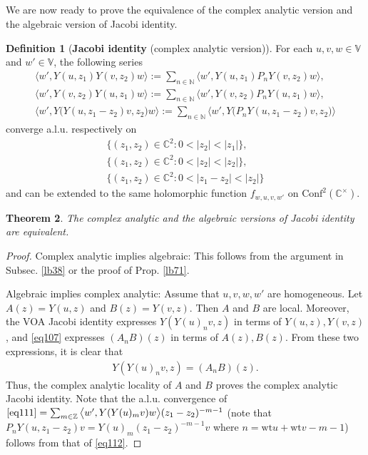 \documentclass[12pt,a4paper,notitlepage]{article}
\theoremstyle{definition}
\newtheorem{df}{Definition}[section]
\theoremstyle{plain}
\newtheorem{thm}[df]{Theorem}
\newcommand{\Conf}{\mathrm{Conf}}
\newcommand{\bigbk}[1]{\big\langle {#1}\big\rangle}
\newcommand{\Vbb}{\mathbb V}
\newcommand{\Cbb}{\mathbb C}
\newcommand{\Nbb}{\mathbb N}
\newcommand{\Zbb}{\mathbb Z}
\newcommand{\wt}{\mathrm{wt}}
\numberwithin{equation}{section}
\begin{document}
\subsection{}

We are now ready to prove the equivalence of the complex analytic version and the algebraic version of Jacobi identity.

\begin{df}[\textbf{Jacobi identity} (complex analytic version)]
For each $u,v,w\in\Vbb$ and $w'\in\Vbb$, the following series
\begin{subequations}
\begin{gather}
\bigbk{w',Y(u,z_1)Y(v,z_2)w}:=\sum_{n\in\Nbb}\bigbk{w',Y(u,z_1)P_nY(v,z_2)w},\label{eq109}\\
\bigbk{w',Y(v,z_2)Y(u,z_1)w}:=\sum_{n\in\Nbb}\bigbk{w',Y(v,z_2)P_nY(u,z_1)w},\label{eq110}\\
\bigbk{w',Y\big(Y(u,z_1-z_2)v,z_2\big)w}:=\sum_{n\in\Nbb}\bigbk{w',Y\big(P_nY(u,z_1-z_2)v,z_2\big)}\label{eq111}
\end{gather}	
\end{subequations}
converge a.l.u. respectively on
\begin{subequations}
\begin{gather}
\{(z_1,z_2)\in\Cbb^2:0<|z_2|<|z_1|\},\\
\{(z_1,z_2)\in\Cbb^2:0<|z_2|<|z_2|\},\\
\{(z_1,z_2)\in\Cbb^2:0<|z_1-z_2|<|z_2|\}
\end{gather}	
\end{subequations}
and can be extended to the same holomorphic function $f_{w,u,v,w'}$ on $\Conf^2(\Cbb^\times)$.
\end{df}

\begin{thm}
The complex analytic and the algebraic versions of Jacobi identity are equivalent.
\end{thm}

\begin{proof}
Complex analytic implies algebraic: This follows from the argument in Subsec. \ref{lb38} or the proof of Prop. \ref{lb71}.

Algebraic implies complex analytic: Assume that $u,v,w,w'$ are homogeneous. Let $A(z)=Y(u,z)$ and $B(z)=Y(v,z)$. Then $A$ and $B$ are local. Moreover, the VOA Jacobi identity expresses $Y(Y(u)_nv,z)$ in terms of $Y(u,z),Y(v,z)$, and \eqref{eq107} expresses $(A_nB)(z)$ in terms of $A(z),B(z)$. From these two expressions, it is clear that
\begin{align}
Y(Y(u)_nv,z)=(A_nB)(z).	\label{eq118}
\end{align}
Thus, the complex analytic locality of $A$ and $B$ proves the complex analytic Jacobi identity. Note that the a.l.u. convergence of $\eqref{eq111}=\sum_{m\in\Zbb}\bigbk{w',Y(Y(u)_mv)w}(z_1-z_2)^{-m-1}$ (note that $P_n Y(u,z_1-z_2)v=Y(u)_m(z_1-z_2)^{-m-1}v$ where $n=\wt u+\wt v-m-1$) follows from that of \eqref{eq112}.
\end{proof}
\end{document}
